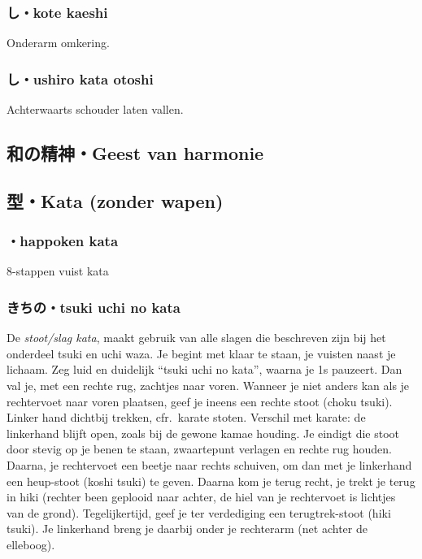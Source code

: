 \subsubsection{し・kote kaeshi}
Onderarm omkering.

\subsubsection{し・ushiro kata otoshi}
Achterwaarts schouder laten vallen.

\subsection{和の精神・Geest van harmonie}

\subsection{型・Kata (zonder wapen)}
\subsubsection{・happoken kata}
8-stappen vuist kata

\subsubsection{きちの・tsuki uchi no kata}
De \textit{stoot/slag kata}, maakt gebruik van alle slagen die beschreven zijn bij het onderdeel tsuki en uchi waza. Je begint met klaar te staan, je vuisten naast je lichaam. Zeg luid en duidelijk ``tsuki uchi no kata'', waarna je 1s pauzeert. Dan val je, met een rechte rug, zachtjes naar voren. Wanneer je niet anders kan als je rechtervoet naar voren plaatsen, geef je ineens een rechte stoot (choku tsuki). Linker hand dichtbij trekken, cfr.\ karate stoten. Verschil met karate: de linkerhand blijft open, zoals bij de gewone kamae houding. Je eindigt die stoot door stevig op je benen te staan, zwaartepunt verlagen en rechte rug houden. Daarna, je rechtervoet een beetje naar rechts schuiven, om dan met je linkerhand een heup-stoot (koshi tsuki) te geven. Daarna kom je terug recht, je trekt je terug in hiki (rechter been geplooid naar achter, de hiel van je rechtervoet is lichtjes van de grond). Tegelijkertijd, geef je ter verdediging een terugtrek-stoot (hiki tsuki). Je linkerhand breng je daarbij onder je rechterarm (net achter de elleboog).

